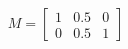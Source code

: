 \documentclass[preview]{standalone}
\begin{document}
\begin{align*}
M = \begin{bmatrix} 1 & 0.5 & 0 \\ 0 & 0.5 & 1 \end{bmatrix}
\end{align*}
\end{document}
